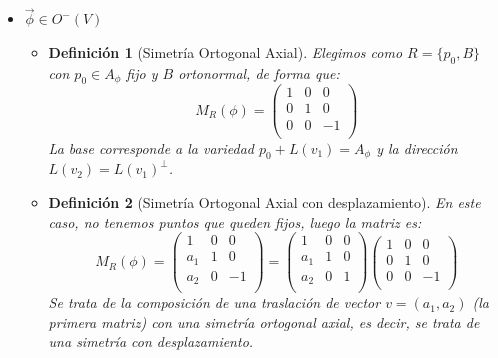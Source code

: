\documentclass[10pt,a4paper,openright]{book}
\theoremstyle{break}
\newtheorem*{defi}{Definición}
\begin{document}
\begin{itemize}
\item $\boxed{\vec{\phi} \in O^-(V)}$
	\begin{itemize}
	\item {}
	
	\begin{defi}[Simetría Ortogonal Axial]
	Elegimos como $R=\{p_0, B\}$ con $p_0\in A_\phi$ fijo y $B$ ortonormal, de forma que:
	$$M_R (\phi) = \left(\begin{array}{c|cc} 1 & 0  & 0  \\ \hline 0 & 1 & 0 \\0 & 0 & -1 \\ \end{array} \right)$$
	La base corresponde a la variedad $p_0 + L(v_1) = A_\phi$ y la dirección $L(v_2) = L(v_1)^\perp$.
	\end{defi}

	\item {}
	
	\begin{defi}[Simetría Ortogonal Axial con desplazamiento]
	En este caso, no tenemos puntos que queden fijos, luego la matriz es:
	$$M_R (\phi) = \left(\begin{array}{c|cc} 1 & 0  & 0  \\ \hline a_1 & 1 & 0 \\ a_2 & 0 & -1 \\ \end{array} \right) = \left(\begin{array}{c|cc} 1 & 0  & 0  \\ \hline a_1 & 1 & 0 \\ a_2 & 0 & 1 \\ \end{array} \right)\left(\begin{array}{c|cc} 1 & 0  & 0  \\ \hline 0 & 1 & 0 \\ 0 & 0 & -1 \\\end{array} \right)$$
	Se trata de la composición de una traslación de vector $v=(a_1, a_2)$ (la primera matriz) con una simetría ortogonal axial, es decir, se trata de una simetría con desplazamiento.
	\end{defi}
	\end{itemize}
\end{itemize}
\end{document}
